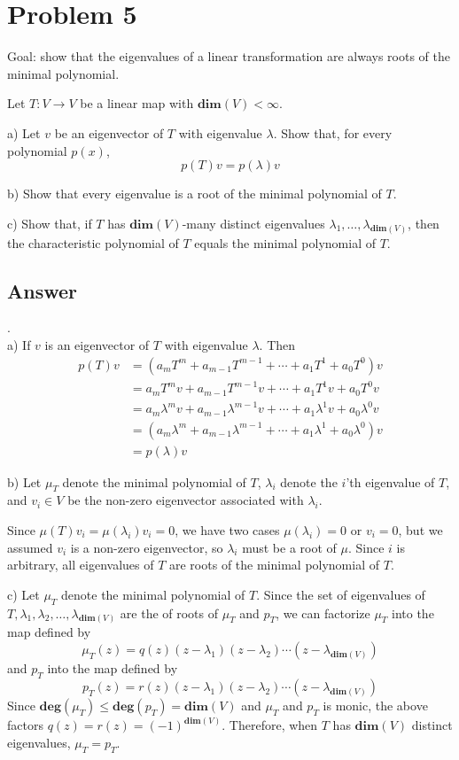 \documentclass[
	12pt, %
]{fphw}
\newcommand\br{\vspace{10 pt}}
\newcommand\0{\mathbf{0}}
\newcommand\ls[2]{\text{$#1_1, \ldots, #1_{#2}$}}
\renewcommand\deg[1]{\textbf{deg$(#1)$}}
\renewcommand\dim[1]{\mathbf{dim}(#1)}
\begin{document}
\section*{Problem 5}
\begin{problem}
Goal: show that the eigenvalues of a linear transformation are always roots of the minimal polynomial.

\br
\noindent
Let $T : V \to V$ be a linear map with $\dim{V} < \infty$.

\br
\noindent
a) Let $v$ be an eigenvector of $T$ with eigenvalue $\lambda$. Show that, for every polynomial $p(x)$,
\begin{equation*}
p(T)v = p(\lambda)v
\end{equation*}

\br
\noindent
b) Show that every eigenvalue is a root of the minimal polynomial of $T$.

\br
\noindent
c) Show that, if $T$ has $\dim{V}$-many distinct eigenvalues $\ls{\lambda}{\dim{V}}$, then the characteristic polynomial of $T$ equals the minimal polynomial of $T$.


\end{problem}

\subsection*{Answer} .\\
a) If $v$ is an eigenvector of $T$ with eigenvalue $\lambda$. Then
\begin{align*}
p(T)v &= (a_m T^m + a_{m-1} T^{m-1} + \cdots + a_1 T^1 + a_0 T^0)v \\
&= a_m T^m v + a_{m-1} T^{m-1} v + \cdots + a_1 T^1 v + a_0 T^0 v \\
&= a_m \lambda^m v + a_{m-1} \lambda^{m-1} v + \cdots + a_1 \lambda^1 v + a_0 \lambda^0 v \\
&= (a_m \lambda^m + a_{m-1} \lambda^{m-1} + \cdots + a_1 \lambda^1 + a_0 \lambda^0) v \\
&= p(\lambda) v
\end{align*}

\noindent
b) Let $\mu_T$ denote the minimal polynomial of $T$, $\lambda_i$ denote the $i$'th eigenvalue of $T$, and $v_i \in V$ be the non-zero eigenvector associated with $\lambda_i$. 

\br
\noindent
Since $\mu(T) v_i = \mu (\lambda_i) v_i = 0$, we have two cases $\mu(\lambda_i) = 0$ or $v_i = 0$, but we assumed $v_i$ is a non-zero eigenvector, so $\lambda_i$ must be a root of $\mu$. Since $i$ is arbitrary, all eigenvalues of $T$ are roots of the minimal polynomial of $T$.

\br
\noindent
c) Let $\mu_T$ denote the minimal polynomial of $T$. Since the set of eigenvalues of $T, \lambda_1, \lambda_2, \ldots, \lambda_{\dim{V}}$ are the of roots of $\mu_T$ and $p_T$, we can factorize $\mu_T$ into the map defined by
$$
\mu_T(z) = q(z)(z-\lambda_1)(z-\lambda_2)\cdots(z-\lambda_{\dim{V}})
$$
and $p_T$ into the map defined by
$$
p_T(z) = r(z)(z-\lambda_1)(z-\lambda_2)\cdots(z-\lambda_{\dim{V}})
$$
Since $\deg{\mu_T} \le \deg{p_T} = \dim{V}$ and $\mu_T$ and $p_T$ is monic, the above factors $q(z) = r(z) = (-1)^{\dim{V}}$. Therefore, when $T$ has $\dim{V}$ distinct eigenvalues, $\mu_T = p_T$.
\newpage
\end{document}
